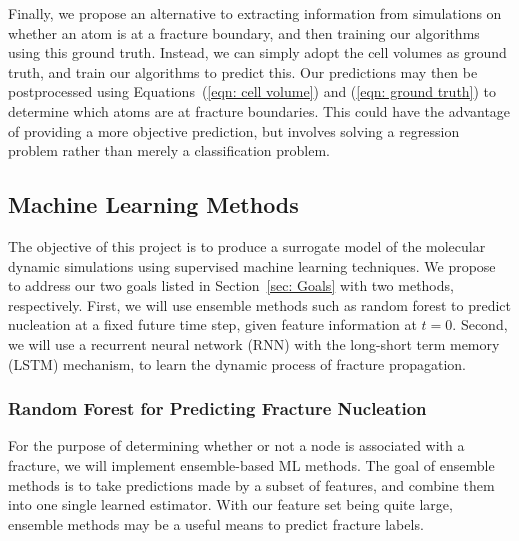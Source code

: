 Finally, we propose an alternative to extracting information from simulations on whether an atom is at a fracture boundary, and then training our algorithms using this ground truth.  Instead, we can simply adopt the cell volumes as ground truth, and train our algorithms to predict this.  Our predictions may then be postprocessed using Equations~(\ref{eqn: cell volume}) and (\ref{eqn: ground truth}) to determine which atoms are at fracture boundaries.  This could have the advantage of providing a more objective prediction, but involves solving a regression problem rather than merely a classification problem.

\subsection{Machine Learning Methods}

The objective of this project is to produce a surrogate model of the molecular dynamic simulations using supervised machine learning techniques. We propose to address our two goals listed in Section~\ref{sec: Goals} with two methods, respectively. First, we will use ensemble methods such as random forest to predict nucleation at a fixed future time step, given feature information at $t=0$.
Second, we will use a recurrent neural network (RNN) with the long-short term memory (LSTM) mechanism, to learn the dynamic process of fracture propagation. %

\subsubsection{Random Forest for Predicting Fracture Nucleation}

For the purpose of determining whether or not a node is associated with a fracture, we will implement ensemble-based ML methods. The goal of ensemble methods is to take predictions made by a subset of features, and combine them into one single learned estimator. With our feature set being quite large, ensemble methods may be a useful means to predict fracture labels. 

